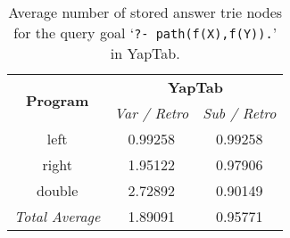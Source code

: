 \begin{table}[ht]
\centering
  \begin{tabular}{ccc}
   \hline
    \hline
    \multirow{2}{*}{\textbf{Program}} & \multicolumn{2}{c}{\textbf{YapTab}} \\
    & \textit{\small{Var / Retro}} & \textit{\small{Sub / Retro}} \\
   \hline
   \hline
   left & 0.99258 & 0.99258 \\
   right & 1.95122 & 0.97906 \\
   double & 2.72892 & 0.90149 \\
\hline
\hline
\textit{Total Average} & 1.89091 &  0.95771 \\
\hline
\hline
\end{tabular}
\caption{Average number of stored answer trie nodes for the query goal `\texttt{?-~path(f(X),f(Y)).}' in YapTab.}
\label{tbl:results_average_stst_space}
\end{table}


